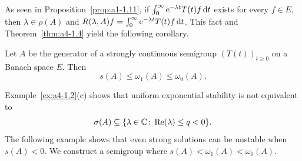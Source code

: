 As seen in Proposition~\ref{prop:a1-1.11}, if\/ $\int_0^\infty \mathrm{e}^{-\lambda t} T(t) f  \mathop{}\!\mathrm{d}{t}$ exists for every $f \in E$, then $\lambda \in \rho(A)$ and $R(\lambda, A) f = \int_0^\infty \mathrm{e}^{-\lambda t} T(t) f  \mathop{}\!\mathrm{d}{t}$. 
This fact and Theorem~\ref{thm:a4-1.4} yield the following corollary.
\begin{corollary} \label{cor:a4-1.5}
Let $ A $ be the generator of a strongly continuous semigroup $ (T(t))_{t \geq 0} $ on a Banach space $ E $. 
Then  
\[
s(A) \leq \omega_1(A) \leq \omega_{0}(A).
\]
\end{corollary}
Example~\ref{ex:a4-1.2}(c) shows that uniform exponential stability is not equivalent to 
%
\[
	\sigma(A) \subseteq \{\lambda \in \C \colon \Re(\lambda) \leq q < 0 \} .
\]
%
The following example shows that even strong solutions can be unstable when $ s(A) < 0 $. 
We construct a semigroup where $ s(A) < \omega_1(A) < \omega_{0}(A) $.
